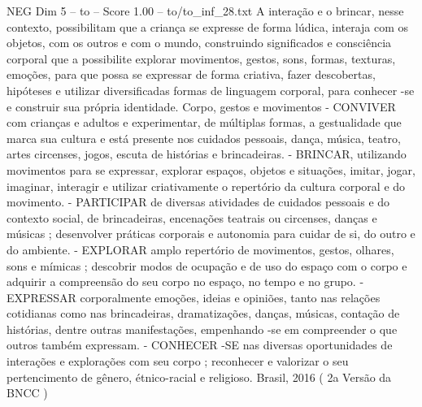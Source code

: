 \begin{textsample}{NEG Dim 5 – to – Score 1.00 – to/to\_inf\_28.txt}
A interação e o brincar, nesse contexto, possibilitam que a criança se expresse de forma lúdica, interaja com os objetos, com os outros e com o mundo, construindo significados e consciência corporal que a possibilite explorar movimentos, gestos, sons, formas, texturas, emoções, para que possa se expressar de forma criativa, fazer descobertas, hipóteses e utilizar diversificadas formas de linguagem corporal, para conhecer -se e construir sua própria identidade.
Corpo, gestos e movimentos - CONVIVER com crianças e adultos e experimentar, de múltiplas formas, a gestualidade que marca sua cultura e está presente nos cuidados pessoais, dança, música, teatro, artes circenses, jogos, escuta de histórias e brincadeiras. - BRINCAR, utilizando movimentos para se expressar, explorar espaços, objetos e situações, imitar, jogar, imaginar, interagir e utilizar criativamente o repertório da cultura corporal e do movimento. - PARTICIPAR de diversas atividades de cuidados pessoais e do contexto social, de brincadeiras, encenações teatrais ou circenses, danças e músicas ; desenvolver práticas corporais e autonomia para cuidar de si, do outro e do ambiente. - EXPLORAR amplo repertório de movimentos, gestos, olhares, sons e mímicas ; descobrir modos de ocupação e de uso do espaço com o corpo e adquirir a compreensão do seu corpo no espaço, no tempo e no grupo. - EXPRESSAR corporalmente emoções, ideias e opiniões, tanto nas relações cotidianas como nas brincadeiras, dramatizações, danças, músicas, contação de histórias, dentre outras manifestações, empenhando -se em compreender o que outros também expressam. - CONHECER -SE nas diversas oportunidades de interações e explorações com seu corpo ; reconhecer e valorizar o seu pertencimento de gênero, étnico-racial e religioso.
Brasil, 2016 ( 2a Versão da BNCC )

\end{textsample}
